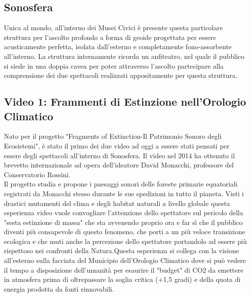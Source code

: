 \documentclass[hidelinks,12pt,a4paper]{article}
\begin{document}
\begin{flushleft}
			\section{Sonosfera}
			Unica al mondo, all'interno dei Musei Civici è presente questa particolare struttura per l'ascolto profondo a forma di geoide progettata per essere acusticamente perfetta, isolata dall'esterno e completamente fono-assorbente all'interno. La struttura internamente ricorda un anfiteatro, nel quale il pubblico si siede in una doppia cavea per poter attraverso l'ascolto partecipare alla comprensione dei due spettacoli realizzati appositamente per questa struttura.
	
			\subsection{Video 1: Frammenti di Estinzione nell'Orologio Climatico}
			Nato per il progetto "Fragments of Extinction-Il Patrimonio Sonoro degli Ecosistemi", è stato il primo dei due video ad oggi a essere stati pensati per essere degli spettacoli all'interno di Sonosfera. Il video nel 2014 ha ottenuto il brevetto internazionale ad opera dell'ideatore David Monacchi, professore del Conservatorio Rossini.\\
			Il progetto studia e propone i paesaggi sonori delle foreste primarie equatoriali registrati da Monacchi stesso durante le sue spedizioni in tutto il pianeta. Visti i drastici mutamenti del clima e degli habitat naturali a livello globale questa esperienza video vuole convogliare l'attenzione dello spettatore sul pericolo della "sesta estinzione di massa" che sta avvenendo proprio ora e far sì che il pubblico diventi più consapevole di questo fenomeno, che porti a un più veloce transizione ecologica e che muti anche la percezione dello spettatore portandolo ad essere più rispettoso nei confronti della Natura.Questa esperienza si collega con la visione all'esterno sulla facciata del Municipio dell'Orologio Climatico dove si può vedere il tempo a disposizione dell'umanità per esaurire il "budget" di CO2 da emettere in atmosfera prima di oltrepassare la soglia critica (+1,5 gradi) e della quota di energia prodotta da fonti rinnovabili.
	

\end{flushleft}
\end{document}
